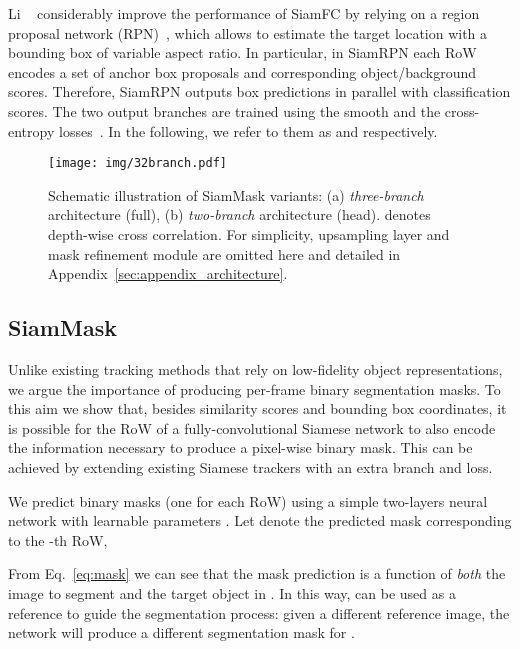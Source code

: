 \documentclass[10pt,twocolumn,letterpaper]{article}
\newcommand{\mypar}[1]{\smallskip\noindent {\bf #1}\enskip}
\begin{document}
\mypar{SiamRPN.}
Li \etal~\cite{SiamRPN} considerably improve the performance of SiamFC by relying on a region proposal network (RPN)~\cite{ren2015faster, feichtenhofer2017detect}, which allows to estimate the target location with a bounding box of variable aspect ratio.
In particular, in SiamRPN each RoW encodes a set of  anchor box proposals and corresponding object/background scores.
Therefore, SiamRPN outputs box predictions in parallel with classification scores.
The two output branches are trained using the smooth  and the cross-entropy losses~\cite[Section 3.2]{SiamRPN}.
In the following, we refer to them as  and  respectively.

\begin{figure*}
\begin{center}
\texttt{[image: img/32branch.pdf]}
\end{center}
\caption{Schematic illustration of SiamMask variants: (a) \textit{three-branch} architecture (full), (b) \textit{two-branch} architecture (head).   denotes depth-wise cross correlation. For simplicity, upsampling layer and mask refinement module are omitted here and detailed in Appendix~\ref{sec:appendix_architecture}.}
\label{fig:schematic}
\vspace{-0.2cm}
\end{figure*}

\subsection{SiamMask}
\label{sec:siammask}
Unlike existing tracking methods that rely on low-fidelity object representations, we argue the importance of producing per-frame binary segmentation masks.
To this aim we show that, besides similarity scores and bounding box coordinates, it is possible for the RoW of a fully-convolutional Siamese network to also encode the information necessary to produce a pixel-wise binary mask.
This can be achieved by extending existing Siamese trackers with an extra branch and loss.

We predict  binary masks (one for each RoW) using a simple two-layers neural network  with learnable parameters .
Let  denote the predicted mask corresponding to the -th RoW,

From Eq.~\ref{eq:mask} we can see that the mask prediction is a function of \emph{both} the image to segment  and the target object in .
In this way,  can be used as a reference to guide the segmentation process:
given a different reference image, the network will produce a different segmentation mask for .
\end{document}

